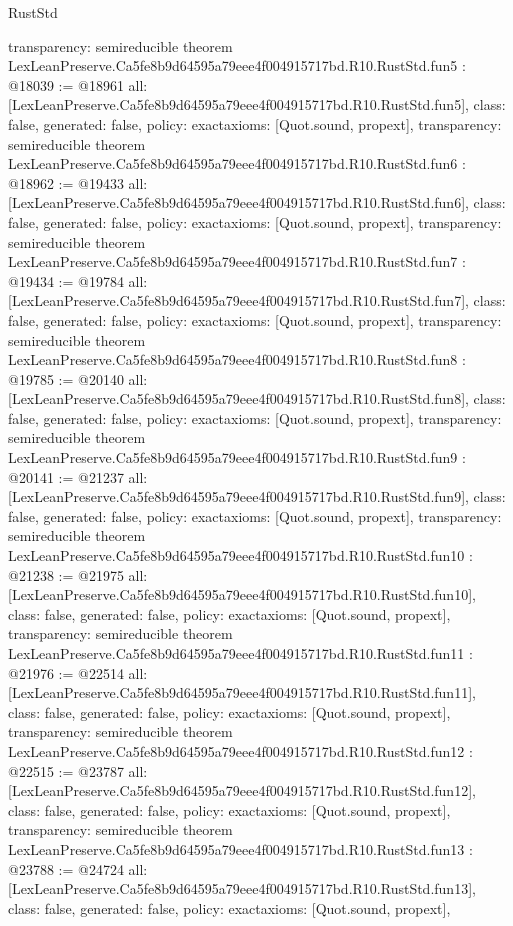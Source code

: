 \begin{lexlean}{RustStd}
\begin{coremodule}
{  transparency: semireducible
}
theorem LexLeanPreserve.Ca5fe8b9d64595a79eee4f004915717bd.R10.RustStd.fun5 : @18039 := @18961 {
  all: [LexLeanPreserve.Ca5fe8b9d64595a79eee4f004915717bd.R10.RustStd.fun5],
  class: false,
  generated: false,
  policy: exact{axioms: [Quot.sound, propext]},
  transparency: semireducible
}
theorem LexLeanPreserve.Ca5fe8b9d64595a79eee4f004915717bd.R10.RustStd.fun6 : @18962 := @19433 {
  all: [LexLeanPreserve.Ca5fe8b9d64595a79eee4f004915717bd.R10.RustStd.fun6],
  class: false,
  generated: false,
  policy: exact{axioms: [Quot.sound, propext]},
  transparency: semireducible
}
theorem LexLeanPreserve.Ca5fe8b9d64595a79eee4f004915717bd.R10.RustStd.fun7 : @19434 := @19784 {
  all: [LexLeanPreserve.Ca5fe8b9d64595a79eee4f004915717bd.R10.RustStd.fun7],
  class: false,
  generated: false,
  policy: exact{axioms: [Quot.sound, propext]},
  transparency: semireducible
}
theorem LexLeanPreserve.Ca5fe8b9d64595a79eee4f004915717bd.R10.RustStd.fun8 : @19785 := @20140 {
  all: [LexLeanPreserve.Ca5fe8b9d64595a79eee4f004915717bd.R10.RustStd.fun8],
  class: false,
  generated: false,
  policy: exact{axioms: [Quot.sound, propext]},
  transparency: semireducible
}
theorem LexLeanPreserve.Ca5fe8b9d64595a79eee4f004915717bd.R10.RustStd.fun9 : @20141 := @21237 {
  all: [LexLeanPreserve.Ca5fe8b9d64595a79eee4f004915717bd.R10.RustStd.fun9],
  class: false,
  generated: false,
  policy: exact{axioms: [Quot.sound, propext]},
  transparency: semireducible
}
theorem LexLeanPreserve.Ca5fe8b9d64595a79eee4f004915717bd.R10.RustStd.fun10 : @21238 := @21975 {
  all: [LexLeanPreserve.Ca5fe8b9d64595a79eee4f004915717bd.R10.RustStd.fun10],
  class: false,
  generated: false,
  policy: exact{axioms: [Quot.sound, propext]},
  transparency: semireducible
}
theorem LexLeanPreserve.Ca5fe8b9d64595a79eee4f004915717bd.R10.RustStd.fun11 : @21976 := @22514 {
  all: [LexLeanPreserve.Ca5fe8b9d64595a79eee4f004915717bd.R10.RustStd.fun11],
  class: false,
  generated: false,
  policy: exact{axioms: [Quot.sound, propext]},
  transparency: semireducible
}
theorem LexLeanPreserve.Ca5fe8b9d64595a79eee4f004915717bd.R10.RustStd.fun12 : @22515 := @23787 {
  all: [LexLeanPreserve.Ca5fe8b9d64595a79eee4f004915717bd.R10.RustStd.fun12],
  class: false,
  generated: false,
  policy: exact{axioms: [Quot.sound, propext]},
  transparency: semireducible
}
theorem LexLeanPreserve.Ca5fe8b9d64595a79eee4f004915717bd.R10.RustStd.fun13 : @23788 := @24724 {
  all: [LexLeanPreserve.Ca5fe8b9d64595a79eee4f004915717bd.R10.RustStd.fun13],
  class: false,
  generated: false,
  policy: exact{axioms: [Quot.sound, propext]},
}
\end{coremodule}
\end{lexlean}
